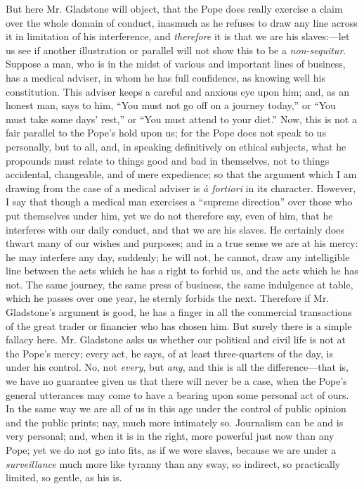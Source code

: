 But here Mr. Gladstone will object, that the Pope does really
exercise a claim over the whole domain of conduct, inasmuch as he
refuses to draw any line across it in limitation of his interference,
and \emph{therefore} it is that we are his slaves:—let us see if
another illustration or parallel will not show this to be a \emph{non-sequitur}.
Suppose a man, who is in the midst of various and important lines of
business, has a medical adviser, in whom he has full confidence, as
knowing well his constitution. This adviser keeps a careful and anxious
eye upon him; and, as an honest man, says to him, ``You must not go
off on a journey today,'' or ``You must take some days'
rest,'' or ``You must attend to your diet.'' Now, this is
not a fair parallel to the Pope's hold upon us; for the Pope does not
speak to us personally, but to all, and, in speaking definitively on
ethical subjects, what he propounds must relate to things good and bad
in themselves, not to things accidental, changeable, and of mere
expedience; so that the argument which I am drawing from the case of a
medical adviser is \emph{à fortiori} in its character. However, I say
that though a medical man exercises a ``supreme direction'' over
those who put themselves under him, yet we do not therefore say,
even of him, that he interferes with our daily conduct, and that we are
his slaves. He certainly does thwart many of our wishes and purposes;
and in a true sense we are at his mercy: he may interfere any day,
suddenly; he will not, he cannot, draw any intelligible line between the
acts which he has a right to forbid us, and the acts which he has not.
The same journey, the same press of business, the same indulgence at
table, which he passes over one year, he sternly forbids the next.
Therefore if Mr. Gladstone's argument is good, he has a finger in all
the commercial transactions of the great trader or financier who has
chosen him. But surely there is a simple fallacy here. Mr. Gladstone
asks us whether our political and civil life is not at the Pope's mercy;
every act, he says, of at least three-quarters of the day, is under his
control. No, not \emph{every}, but \emph{any}, and this is all the
difference—that is, we have no guarantee given us that there will
never be a case, when the Pope's general utterances may come to have a
bearing upon some personal act of ours. In the same way we are all of us
in this age under the control of public opinion and the public prints;
nay, much more intimately so. Journalism can be and is very personal;
and, when it is in the right, more powerful just now than any Pope; yet
we do not go into fits, as if we were slaves, because we are under a \emph{surveillance}
much more like tyranny than any sway, so indirect, so practically
limited, so gentle, as his is.


